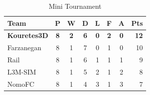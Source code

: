 \begin{table}[t!]
\caption{Mini Tournament}
\label{EasyTournament}
\begin{center}
\begin{tabular}{l*{6}{c}r}
Team              	& P & W & D & L & F  & A & Pts \\ \hline
\textbf{Kouretes3D} & \textbf{8} & \textbf{2} & \textbf{6} & \textbf{0} & \textbf{ 2} & \textbf{0} &  \textbf{12}  \\
Farzanegan     		& 8 & 1 & 7 & 0 &  1 & 0 &  10  \\
Rail     		    & 8 & 1 & 6 & 1 &  1 & 1 &  9  \\
L3M-SIM     		& 8 & 1 & 5 & 2 &  1 & 2 &  8  \\
NomoFC            	& 8 & 1 & 4 & 3 &  1 & 3 &  7  \\
\end{tabular}
\end{center}
\end{table}






